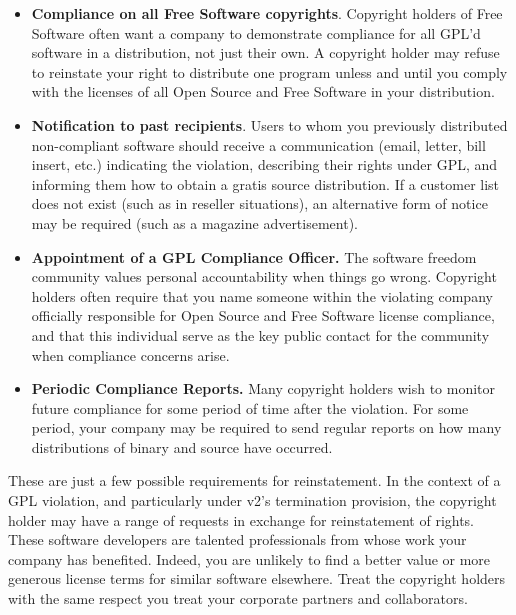 \begin{itemize}

\item {\bf Compliance on all Free Software copyrights}.  Copyright holders of Free Software
  often want a company to demonstrate compliance for all GPL'd software in
  a distribution, not just their own.  A copyright holder may refuse to
  reinstate your right to distribute one program unless and until you
  comply with the licenses of all Open Source and Free Software in your distribution.
 
\item {\bf Notification to past recipients}.  Users to whom you previously
  distributed non-compliant software should receive a communication
  (email, letter, bill insert, etc.) indicating the violation, describing
  their rights under GPL, and informing them how to obtain a gratis source
  distribution.  If a customer list does not exist (such as in reseller
  situations), an alternative form of notice may be required (such as a
  magazine advertisement).

\item {\bf Appointment of a GPL Compliance Officer.}  The software freedom community
  values personal accountability when things go wrong.  Copyright holders
  often require that you name someone within the violating company
  officially responsible for Open Source and Free Software license compliance, and that this
  individual serve as the key public contact for the community when
  compliance concerns arise.

\item {\bf Periodic Compliance Reports.}  Many copyright holders wish to
  monitor future compliance for some period of time after the violation.
  For some period, your company may be required to send regular reports on
  how many distributions of binary and source have occurred.
\end{itemize}

These are just a few possible requirements for reinstatement.  In the
context of a GPL violation, and particularly under v2's termination
provision, the copyright holder may have a range of requests in exchange
for reinstatement of rights.  These software developers are talented
professionals from whose work your company has benefited.  Indeed, you are
unlikely to find a better value or more generous license terms for similar
software elsewhere.  Treat the copyright holders with the same respect you
treat your corporate partners and collaborators.

